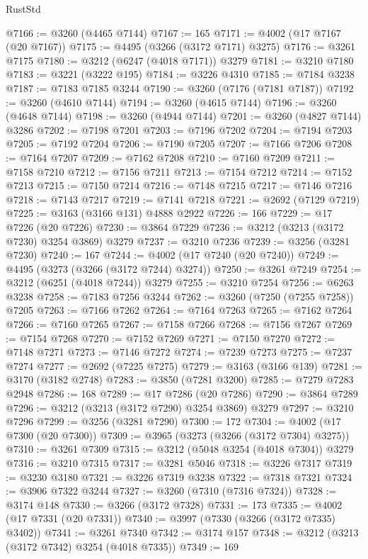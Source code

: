 \begin{lexlean}{RustStd}
\begin{coremodule}
@7166 := @3260 (@4465 @7144)
@7167 := 165
@7171 := @4002 (@17 @7167 (@20 @7167))
@7175 := @4495 (@3266 (@3172 @7171) @3275)
@7176 := @3261 @7175
@7180 := @3212 (@6247 (@4018 @7171)) @3279
@7181 := @3210 @7180
@7183 := @3221 (@3222 @195)
@7184 := @3226 @4310
@7185 := @7184 @3238
@7187 := @7183 @7185 @3244
@7190 := @3260 (@7176 (@7181 @7187))
@7192 := @3260 (@4610 @7144)
@7194 := @3260 (@4615 @7144)
@7196 := @3260 (@4648 @7144)
@7198 := @3260 (@4944 @7144)
@7201 := @3260 (@4827 @7144) @3286
@7202 := @7198 @7201
@7203 := @7196 @7202
@7204 := @7194 @7203
@7205 := @7192 @7204
@7206 := @7190 @7205
@7207 := @7166 @7206
@7208 := @7164 @7207
@7209 := @7162 @7208
@7210 := @7160 @7209
@7211 := @7158 @7210
@7212 := @7156 @7211
@7213 := @7154 @7212
@7214 := @7152 @7213
@7215 := @7150 @7214
@7216 := @7148 @7215
@7217 := @7146 @7216
@7218 := @7143 @7217
@7219 := @7141 @7218
@7221 := @2692 (@7129 @7219)
@7225 := @3163 (@3166 @131) @4888 @2922
@7226 := 166
@7229 := @17 @7226 (@20 @7226)
@7230 := @3864 @7229
@7236 := @3212 (@3213 (@3172 @7230) @3254 @3869) @3279
@7237 := @3210 @7236
@7239 := @3256 (@3281 @7230)
@7240 := 167
@7244 := @4002 (@17 @7240 (@20 @7240))
@7249 := @4495 (@3273 (@3266 (@3172 @7244) @3274))
@7250 := @3261 @7249
@7254 := @3212 (@6251 (@4018 @7244)) @3279
@7255 := @3210 @7254
@7256 := @6263 @3238
@7258 := @7183 @7256 @3244
@7262 := @3260 (@7250 (@7255 @7258)) @7205
@7263 := @7166 @7262
@7264 := @7164 @7263
@7265 := @7162 @7264
@7266 := @7160 @7265
@7267 := @7158 @7266
@7268 := @7156 @7267
@7269 := @7154 @7268
@7270 := @7152 @7269
@7271 := @7150 @7270
@7272 := @7148 @7271
@7273 := @7146 @7272
@7274 := @7239 @7273
@7275 := @7237 @7274
@7277 := @2692 (@7225 @7275)
@7279 := @3163 (@3166 @139)
@7281 := @3170 (@3182 @2748)
@7283 := @3850 (@7281 @3200)
@7285 := @7279 @7283 @2948
@7286 := 168
@7289 := @17 @7286 (@20 @7286)
@7290 := @3864 @7289
@7296 := @3212 (@3213 (@3172 @7290) @3254 @3869) @3279
@7297 := @3210 @7296
@7299 := @3256 (@3281 @7290)
@7300 := 172
@7304 := @4002 (@17 @7300 (@20 @7300))
@7309 := @3965 (@3273 (@3266 (@3172 @7304) @3275))
@7310 := @3261 @7309
@7315 := @3212 (@5048 @3254 (@4018 @7304)) @3279
@7316 := @3210 @7315
@7317 := @3281 @5046
@7318 := @3226 @7317
@7319 := @3230 @3180
@7321 := @3226 @7319 @3238
@7322 := @7318 @7321
@7324 := @3906 @7322 @3244
@7327 := @3260 (@7310 (@7316 @7324))
@7328 := @3174 @148
@7330 := @3266 (@3172 @7328)
@7331 := 173
@7335 := @4002 (@17 @7331 (@20 @7331))
@7340 := @3997 (@7330 (@3266 (@3172 @7335) @3402))
@7341 := @3261 @7340
@7342 := @3174 @157
@7348 := @3212 (@3213 (@3172 @7342) @3254 (@4018 @7335))
@7349 := 169

\end{coremodule}
\end{lexlean}
